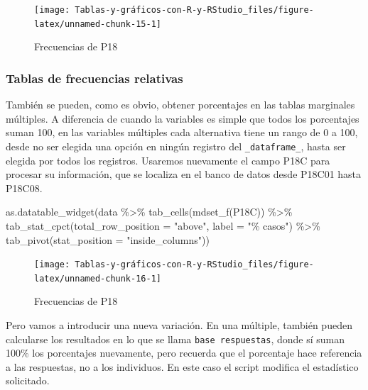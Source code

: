 \documentclass[
]{book}
\newenvironment{Shaded}{\begin{snugshade}}{\end{snugshade}}
\newcommand{\AttributeTok}[1]{\textcolor[rgb]{0.77,0.63,0.00}{#1}}
\newcommand{\FunctionTok}[1]{\textcolor[rgb]{0.00,0.00,0.00}{#1}}
\newcommand{\NormalTok}[1]{#1}
\newcommand{\SpecialCharTok}[1]{\textcolor[rgb]{0.00,0.00,0.00}{#1}}
\newcommand{\StringTok}[1]{\textcolor[rgb]{0.31,0.60,0.02}{#1}}
\begin{document}
\begin{figure}[H]

{\centering \texttt{[image: Tablas-y-gráficos-con-R-y-RStudio\_files/figure-latex/unnamed-chunk-15-1]} 

}

\caption{Frecuencias de P18}\label{fig:unnamed-chunk-15}
\end{figure}

\hypertarget{tablas-de-frecuencias-relativas-1}{%
\subsubsection{Tablas de frecuencias relativas}\label{tablas-de-frecuencias-relativas-1}}

También se pueden, como es obvio, obtener porcentajes en las tablas marginales múltiples. A diferencia de cuando la variables es simple que todos los porcentajes suman 100, en las variables múltiples cada alternativa tiene un rango de 0 a 100, desde no ser elegida una opción en ningún registro del \texttt{\_dataframe\_}, hasta ser elegida por todos los registros. Usaremos nuevamente el campo P18C para procesar su información, que se localiza en el banco de datos desde P18C01 hasta P18C08.

\begin{Shaded}
\begin{Highlighting}[]
\FunctionTok{as.datatable\_widget}\NormalTok{(data }\SpecialCharTok{\%\textgreater{}\%} \FunctionTok{tab\_cells}\NormalTok{(}\FunctionTok{mdset\_f}\NormalTok{(P18C)) }\SpecialCharTok{\%\textgreater{}\%} 
  \FunctionTok{tab\_stat\_cpct}\NormalTok{(}\AttributeTok{total\_row\_position =} \StringTok{"above"}\NormalTok{, }\AttributeTok{label =} \StringTok{"\% casos"}\NormalTok{) }\SpecialCharTok{\%\textgreater{}\%} 
  \FunctionTok{tab\_pivot}\NormalTok{(}\AttributeTok{stat\_position =} \StringTok{"inside\_columns"}\NormalTok{))}
\end{Highlighting}
\end{Shaded}

\begin{figure}[H]

{\centering \texttt{[image: Tablas-y-gráficos-con-R-y-RStudio\_files/figure-latex/unnamed-chunk-16-1]} 

}

\caption{Frecuencias de P18}\label{fig:unnamed-chunk-16}
\end{figure}

Pero vamos a introducir una nueva variación. En una múltiple, también pueden calcularse los resultados en lo que se llama \texttt{base\ respuestas}, donde sí suman 100\% los porcentajes nuevamente, pero recuerda que el porcentaje hace referencia a las respuestas, no a los individuos. En este caso el script modifica el estadístico solicitado.
\end{document}

